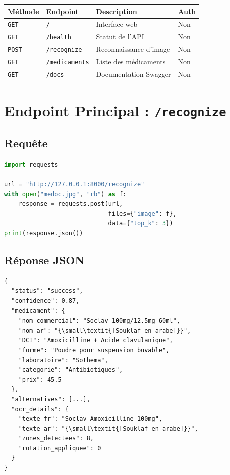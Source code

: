 \documentclass[12pt,a4paper]{report}
\newcommand{\code}[1]{\texttt{\small #1}}
\begin{document}
\begin{center}
\begin{tabular}{llll}
\toprule
\textbf{M\'ethode} & \textbf{Endpoint} & \textbf{Description} & \textbf{Auth} \\
\midrule
\code{GET} & \code{/} & Interface web & Non \\
\code{GET} & \code{/health} & Statut de l'API & Non \\
\code{POST} & \code{/recognize} & Reconnaissance d'image & Non \\
\code{GET} & \code{/medicaments} & Liste des m\'edicaments & Non \\
\code{GET} & \code{/docs} & Documentation Swagger & Non \\
\bottomrule
\end{tabular}
\end{center}

\section{Endpoint Principal : \code{/recognize}}

\subsection{Requ\^ete}

\begin{codebox}
\begin{lstlisting}[language=Python]
import requests

url = "http://127.0.0.1:8000/recognize"
with open("medoc.jpg", "rb") as f:
    response = requests.post(url, 
                             files={"image": f},
                             data={"top_k": 3})
print(response.json())
\end{lstlisting}
\end{codebox}

\subsection{R\'eponse JSON}

\begin{codebox}
\begin{lstlisting}
{
  "status": "success",
  "confidence": 0.87,
  "medicament": {
    "nom_commercial": "Soclav 100mg/12.5mg 60ml",
    "nom_ar": "{\small\textit{[Souklaf en arabe]}}",
    "DCI": "Amoxicilline + Acide clavulanique",
    "forme": "Poudre pour suspension buvable",
    "laboratoire": "Sothema",
    "categorie": "Antibiotiques",
    "prix": 45.5
  },
  "alternatives": [...],
  "ocr_details": {
    "texte_fr": "Soclav Amoxicilline 100mg",
    "texte_ar": "{\small\textit{[Souklaf en arabe]}}",
    "zones_detectees": 8,
    "rotation_appliquee": 0
  }
}
\end{lstlisting}
\end{codebox}
\end{document}
